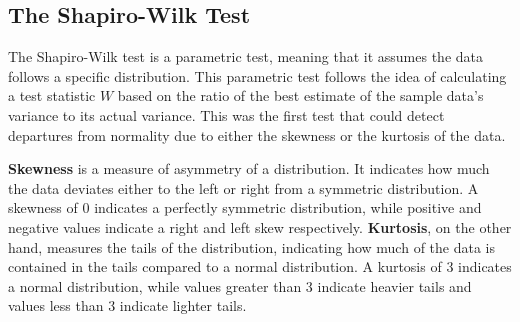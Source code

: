 \documentclass[12pt]{article}
\begin{document}

\medskip


\subsection{The Shapiro-Wilk Test}\label{ShapiroWilk}

The Shapiro-Wilk test \cite{Shapiro1965} is a parametric test, meaning that it assumes the data follows a specific distribution. This parametric test follows the idea of calculating a test statistic $W$ based on the ratio of the best estimate of the sample data's variance to its actual variance. This was the first test that could detect departures from normality due to either the skewness or the kurtosis of the data.

\medskip
\noindent\textbf{Skewness} is a measure of asymmetry of a distribution. It indicates how much the data deviates either to the left or right from a symmetric distribution. A skewness of 0 indicates a perfectly symmetric distribution, while positive and negative values indicate a right and left skew respectively. \textbf{Kurtosis}, on the other hand, measures the tails of the distribution, indicating how much of the data is contained in the tails compared to a normal distribution. A kurtosis of 3 indicates a normal distribution, while values greater than 3 indicate heavier tails and values less than 3 indicate lighter tails.
\end{document}
